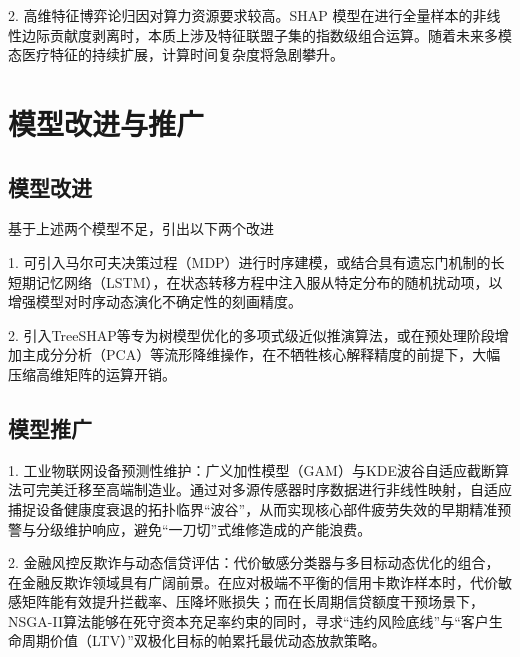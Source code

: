 \documentclass[12pt]{article}
\begin{document}
	{\songti{}
		2.  高维特征博弈论归因对算力资源要求较高。SHAP 模型在进行全量样本的非线性边际贡献度剥离时，本质上涉及特征联盟子集的指数级组合运算。随着未来多模态医疗特征的持续扩展，计算时间复杂度将急剧攀升。
		\par}
	
	\section{模型改进与推广}
	\subsection{模型改进}
	{\songti{}
		基于上述两个模型不足，引出以下两个改进
		\par}
	
	{\songti{}
		1.  可引入马尔可夫决策过程（MDP）进行时序建模，或结合具有遗忘门机制的长短期记忆网络（LSTM），在状态转移方程中注入服从特定分布的随机扰动项，以增强模型对时序动态演化不确定性的刻画精度。
		\par}
	
	{\songti{}
		2.  引入TreeSHAP等专为树模型优化的多项式级近似推演算法，或在预处理阶段增加主成分分析（PCA）等流形降维操作，在不牺牲核心解释精度的前提下，大幅压缩高维矩阵的运算开销。
		\par}
	
	\subsection{模型推广}
	{\songti{}
		1.  工业物联网设备预测性维护：广义加性模型（GAM）与KDE波谷自适应截断算法可完美迁移至高端制造业。通过对多源传感器时序数据进行非线性映射，自适应捕捉设备健康度衰退的拓扑临界“波谷”，从而实现核心部件疲劳失效的早期精准预警与分级维护响应，避免“一刀切”式维修造成的产能浪费。
		\par}
	
	{\songti{}
		2.  金融风控反欺诈与动态信贷评估：代价敏感分类器与多目标动态优化的组合，在金融反欺诈领域具有广阔前景。在应对极端不平衡的信用卡欺诈样本时，代价敏感矩阵能有效提升拦截率、压降坏账损失；而在长周期信贷额度干预场景下，NSGA-II算法能够在死守资本充足率约束的同时，寻求“违约风险底线”与“客户生命周期价值（LTV）”双极化目标的帕累托最优动态放款策略。
		\par}
	
\end{document}
